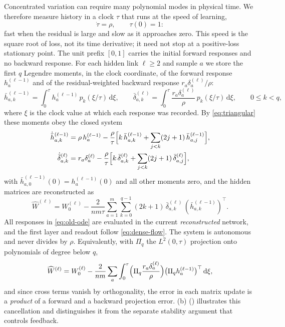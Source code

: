 \documentclass[11pt]{article}
\theoremstyle{definition}
\theoremstyle{remark}
\newcommand{\dd}{\,\mathrm{d}}
\begin{document}
Concentrated variation can require many polynomial modes in physical time.
We therefore measure history in a clock
$\tau$ that runs at the speed of learning,
\begin{equation}
 \dot\tau=\rho,\qquad \tau(0)=1:                        \label{eq:old-clock}
\end{equation}
fast when the residual is large and slow as it approaches zero.  This speed is
the square root of loss, not its time derivative; it need not stop at a
positive-loss stationary point.  The unit prefix
$[0,1]$ carries the initial forward responses and no backward response.  For
each hidden link $\ell\ge2$ and sample $a$ we store the first $q$ Legendre
moments, in the clock coordinate, of the forward response $h_a^{(\ell-1)}$ and
of the residual-weighted backward response $r_a\delta_a^{(\ell)}/\rho$:
\[
 \bar h^{(\ell-1)}_{a,k}=\int_0^{\tau} h_a^{(\ell-1)}\,p_k(\xi/\tau)\dd\xi,\qquad
 \bar\delta^{(\ell)}_{a,k}=\int_0^{\tau}\frac{r_a\delta_a^{(\ell)}}{\rho}\,
 p_k(\xi/\tau)\dd\xi,\qquad 0\le k<q,
\]
where $\xi$ is the clock value at which each response was recorded.  By
\eqref{eq:triangular} these moments obey the closed system
\begin{align}
 \dot{\bar h}^{(\ell-1)}_{a,k}&=\rho\,h_a^{(\ell-1)}-\frac{\rho}{\tau}
 \Bigl[k\,\bar h^{(\ell-1)}_{a,k}+\sum_{j<k}(2j+1)\,\bar h^{(\ell-1)}_{a,j}\Bigr],\nonumber\\
 \dot{\bar\delta}^{(\ell)}_{a,k}&=r_a\delta_a^{(\ell)}-\frac{\rho}{\tau}
 \Bigl[k\,\bar\delta^{(\ell)}_{a,k}+\sum_{j<k}(2j+1)\,\bar\delta^{(\ell)}_{a,j}\Bigr],
 \label{eq:old-ode}
\end{align}
with $\bar h^{(\ell-1)}_{a,0}(0)=h_a^{(\ell-1)}(0)$ and all other moments zero, and
the hidden matrices are reconstructed as
\begin{equation}
 \widehat W^{(\ell)}=W_0^{(\ell)}-\frac{2}{nm\tau}
 \sum_{a=1}^m\sum_{k=0}^{q-1}(2k+1)\,
 \bar\delta^{(\ell)}_{a,k}\,(\bar h^{(\ell-1)}_{a,k})^\top .   \label{eq:old-recon}
\end{equation}
All responses in \eqref{eq:old-ode} are evaluated in the current
\emph{reconstructed} network, and the first layer and readout follow
\eqref{eq:dense-flow}.  The system is autonomous and never divides by $\rho$.
Equivalently, with $\Pi_q$ the $L^2(0,\tau)$ projection onto polynomials of
degree below $q$,
\begin{equation}
 \widehat W^{(\ell)}=W_0^{(\ell)}-\frac{2}{nm}\sum_a
 \int_0^\tau\Bigl(\Pi_q\frac{r_a\delta_a^{(\ell)}}{\rho}\Bigr)
 \bigl(\Pi_q h_a^{(\ell-1)}\bigr)^\top\dd\xi,               \label{eq:projection-form}
\end{equation}
and since cross terms vanish by orthogonality, the error in each matrix update is
a \emph{product} of a forward and a backward projection error.
(b) () illustrates this cancellation and distinguishes it from
the separate stability argument that controls feedback.
\end{document}
